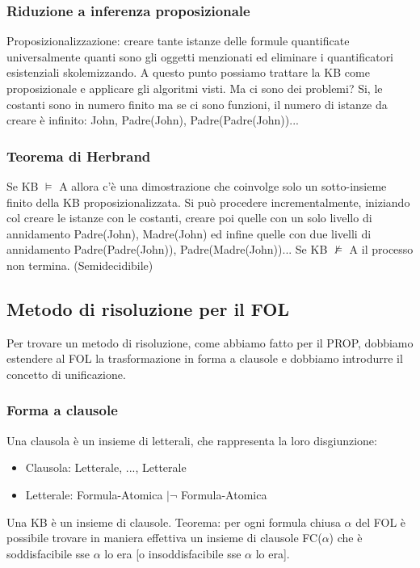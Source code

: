 \documentclass{article}
\begin{document}
\subsubsection{Riduzione a inferenza proposizionale}
Proposizionalizzazione: creare tante istanze delle formule quantificate universalmente quanti sono gli oggetti menzionati ed eliminare i quantificatori esistenziali skolemizzando. A questo punto possiamo trattare la KB come proposizionale e applicare gli algoritmi visti. Ma ci sono dei problemi? Si, le costanti sono in numero finito ma se ci sono funzioni, il numero di istanze da creare è infinito: John, Padre(John), Padre(Padre(John))... 
\subsubsection{Teorema di Herbrand} 
Se KB $\models$ A allora c'è una dimostrazione che coinvolge solo un sotto-insieme finito della KB proposizionalizzata. Si può procedere incrementalmente, iniziando col creare le istanze con le costanti, creare poi quelle con un solo livello di annidamento Padre(John), Madre(John) ed infine quelle con due livelli di annidamento Padre(Padre(John)), Padre(Madre(John))... Se KB $\nvDash$ A il processo non termina. (Semidecidibile)
\subsection{Metodo di risoluzione per il FOL}
Per trovare un metodo di risoluzione, come abbiamo fatto per il PROP, dobbiamo estendere al FOL la trasformazione in forma a clausole e dobbiamo introdurre il concetto di unificazione.
\subsubsection{Forma a clausole}
Una clausola è un insieme di letterali, che rappresenta la loro disgiunzione:
\begin{itemize}
    \item Clausola: {Letterale, ..., Letterale}
    \item Letterale: Formula-Atomica $| \neg$ Formula-Atomica
\end{itemize}
Una KB è un insieme di clausole.\newline
Teorema: per ogni formula chiusa $\alpha$ del FOL è possibile trovare in maniera effettiva un insieme di clausole FC($\alpha$) che è soddisfacibile sse $\alpha$ lo era [o insoddisfacibile sse $\alpha$ lo era].
\end{document}
